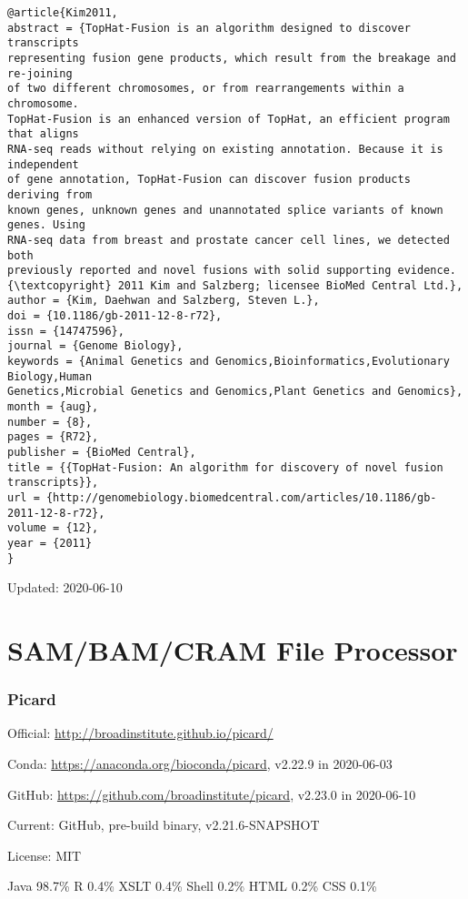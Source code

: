 \documentclass[]{article}
\begin{document}
\begin{verbatim}
@article{Kim2011,
abstract = {TopHat-Fusion is an algorithm designed to discover transcripts
representing fusion gene products, which result from the breakage and re-joining
of two different chromosomes, or from rearrangements within a chromosome.
TopHat-Fusion is an enhanced version of TopHat, an efficient program that aligns
RNA-seq reads without relying on existing annotation. Because it is independent
of gene annotation, TopHat-Fusion can discover fusion products deriving from
known genes, unknown genes and unannotated splice variants of known genes. Using
RNA-seq data from breast and prostate cancer cell lines, we detected both
previously reported and novel fusions with solid supporting evidence.
{\textcopyright} 2011 Kim and Salzberg; licensee BioMed Central Ltd.},
author = {Kim, Daehwan and Salzberg, Steven L.},
doi = {10.1186/gb-2011-12-8-r72},
issn = {14747596},
journal = {Genome Biology},
keywords = {Animal Genetics and Genomics,Bioinformatics,Evolutionary Biology,Human
Genetics,Microbial Genetics and Genomics,Plant Genetics and Genomics},
month = {aug},
number = {8},
pages = {R72},
publisher = {BioMed Central},
title = {{TopHat-Fusion: An algorithm for discovery of novel fusion transcripts}},
url = {http://genomebiology.biomedcentral.com/articles/10.1186/gb-2011-12-8-r72},
volume = {12},
year = {2011}
}

\end{verbatim}

Updated: 2020-06-10

\part{SAM/BAM/CRAM File Processor}

\section{Picard}

Official: \url{http://broadinstitute.github.io/picard/}

Conda: \url{https://anaconda.org/bioconda/picard}, v2.22.9 in 2020-06-03

GitHub: \url{https://github.com/broadinstitute/picard}, v2.23.0 in 2020-06-10

Current: GitHub, pre-build binary, v2.21.6-SNAPSHOT

License: MIT

Java 98.7\% R 0.4\% XSLT 0.4\% Shell 0.2\% HTML 0.2\% CSS 0.1\% 
\end{document}
